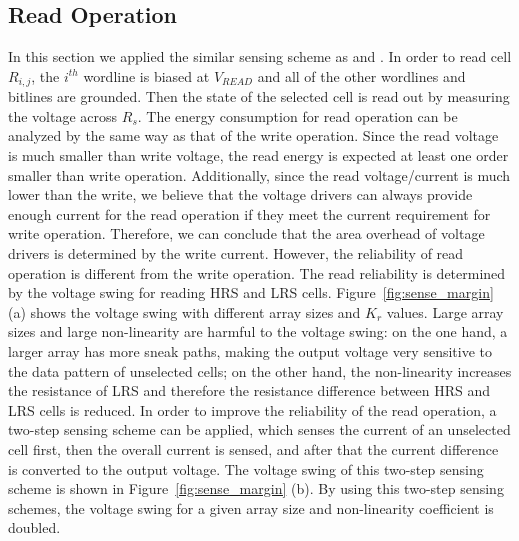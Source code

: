 \subsection{Read Operation}
In this section we applied the similar sensing scheme as
\cite{crossbar_TED_2010} and \cite{crossbar_NANO08_Flocke}. In order to
read cell $R_{i,j}$, the $i^{th}$ wordline is biased at $V_{READ}$ and all
of the other wordlines and bitlines are grounded. Then the state of the
selected cell is read out by measuring the voltage across $R_s$. The
energy consumption for read operation can be analyzed by the same way as
that of the write operation. Since the read voltage is much smaller than
write voltage, the read energy is expected at least one order smaller than
write operation. Additionally, since the read voltage/current is much
lower than the write, we believe that the voltage drivers can always
provide enough current for the read operation if they meet the current
requirement for write operation. Therefore, we can conclude that the area
overhead of voltage drivers is determined by the write current. However,
the reliability of read operation is different from the write operation.
The read reliability is determined by the voltage swing for reading HRS
and LRS cells. Figure~\ref{fig:sense_margin} (a) shows the voltage swing
with different array sizes and $K_r$ values. Large array sizes and large
non-linearity are harmful to the voltage swing: on the one hand, a larger
array has more sneak paths, making the output voltage very sensitive to
the data pattern of unselected cells; on the other hand, the non-linearity
increases the resistance of LRS and therefore the resistance difference
between HRS and LRS cells is reduced. In order to improve the reliability
of the read operation, a two-step sensing scheme can be applied, which
senses the current of an unselected cell first, then the overall current
is sensed, and after that the current difference is converted to the
output voltage. The voltage swing of this two-step sensing scheme is shown
in Figure~\ref{fig:sense_margin} (b). By using this two-step sensing
schemes, the voltage swing for a given array size and non-linearity
coefficient is doubled.

%

